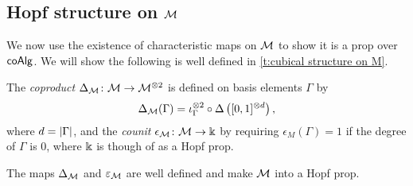 \subsection{Hopf structure on $\mathcal{M}$}

We now use the existence of characteristic maps on $\mathcal{M}$ to show it is a prop over $\mathsf{coAlg}$.
We will show the following is well defined in \cref{t:cubical structure on M}.

\begin{definition}
	The \textit{coproduct} $\Delta_{\mathcal{M}} \colon \mathcal{M} \to \mathcal{M}^{\otimes 2}$ is defined on basis elements $\Gamma$ by
	\begin{equation*}
	\Delta_{\mathcal{M}}(\Gamma) = \iota_\Gamma^{\otimes 2} \circ \Delta \left( [0,1]^{\otimes d} \right),
	\end{equation*}
	where $d = \vert{\Gamma}\vert$, and the \textit{counit} $\epsilon_{\mathcal{M}} \colon \mathcal{M} \to \Bbbk$ by requiring $\epsilon_M(\Gamma) = 1$ if the degree of $\Gamma$ is $0$, where $\Bbbk$ is though of as a Hopf prop.
\end{definition}

\begin{theorem} \label{t:cubical structure on M}
	The maps $\Delta_{\mathcal{M}}$ and $\varepsilon_{\mathcal{M}}$ are well defined and make $\mathcal{M}$ into a Hopf prop.
\end{theorem}

